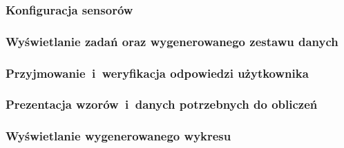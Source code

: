 
\endgroup

\subsubsection{Konfiguracja sensorów}


\subsubsection{Wyświetlanie zadań oraz wygenerowanego zestawu danych}



\subsubsection{Przyjmowanie~i~weryfikacja odpowiedzi użytkownika}



\subsubsection{Prezentacja wzorów~i~danych potrzebnych do obliczeń}



\subsubsection{Wyświetlanie wygenerowanego wykresu}

